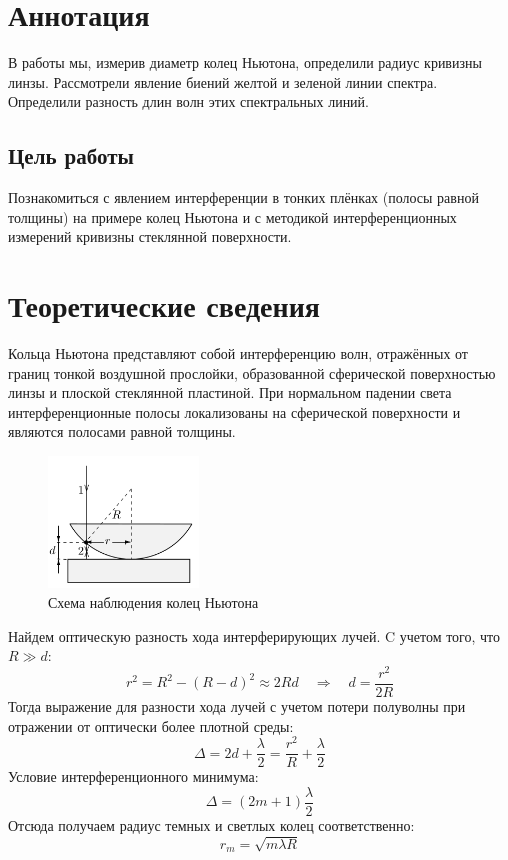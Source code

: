 \section*{Аннотация}
В работы мы, измерив диаметр колец Ньютона, определили радиус кривизны линзы. Рассмотрели явление биений желтой и зеленой линии спектра. Определили разность длин волн этих спектральных линий.

\subsection*{Цель работы}
Познакомиться с явлением интерференции в тонких
плёнках (полосы равной толщины) на примере колец Ньютона и с
методикой интерференционных измерений кривизны стеклянной поверхности.
\section*{Теоретические сведения}
\indent Кольца Ньютона представляют собой интерференцию волн, отражённых от границ тонкой 
воздушной прослойки, образованной сферической поверхностью линзы и плоской
стеклянной пластиной. При нормальном падении света интерференционные полосы 
локализованы на сферической поверхности и являются полосами равной толщины.

\begin{figure}
    \centering
    \includegraphics[width=4cm]{images/theory.png}
    \caption{Схема наблюдения колец Ньютона}
\end{figure}

\indent
Найдем оптическую разность хода интерферирующих лучей. C учетом того, что $R \gg d$:
$$r^2 = R^2 - (R - d)^2 \approx 2Rd \quad \Rightarrow \quad d = \frac{r^2}{2R}$$ 
Тогда выражение для разности хода лучей с учетом потери полуволны при отражении от оптически более плотной среды:
\begin{equation}
    \Delta = 2d + \frac{\lambda}{2} = \frac{r^2}{R} + \frac{\lambda}{2}
\end{equation}
Условие интерференционного минимума:
\begin{equation}
    \Delta = (2m + 1)\frac{\lambda}{2}
\end{equation}
Отсюда получаем радиус темных и светлых колец соответственно:
\begin{equation}
    r_m = \sqrt{m\lambda R} \label{eq:min_radius}
\end{equation}

